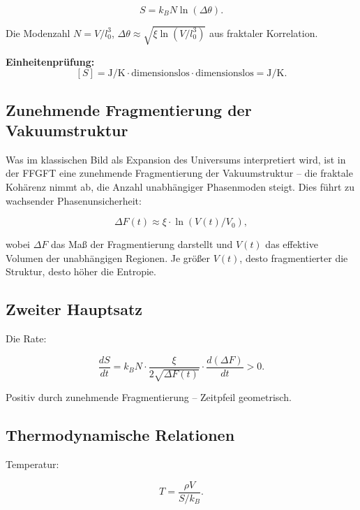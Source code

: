 	\begin{equation}
		S = k_B N \ln(\Delta \theta).
	\end{equation}
	
	Die Modenzahl \(N = V / l_0^3\), \(\Delta \theta \approx \sqrt{\xi \ln(V/l_0^3)}\) aus fraktaler Korrelation.
	
	\textbf{Einheitenprüfung:}
	\[
	[S] = \si{\joule\per\kelvin} \cdot \text{dimensionslos} \cdot \text{dimensionslos} = \si{\joule\per\kelvin}.
	\]
	
	\subsection*{Zunehmende Fragmentierung der Vakuumstruktur}
	
	Was im klassischen Bild als Expansion des Universums interpretiert wird, ist in der FFGFT eine zunehmende Fragmentierung der Vakuumstruktur – die fraktale Kohärenz nimmt ab, die Anzahl unabhängiger Phasenmoden steigt. Dies führt zu wachsender Phasenunsicherheit:
	
	\begin{equation}
		\Delta F(t) \approx \xi \cdot \ln(V(t)/V_0),
	\end{equation}
	
	wobei \(\Delta F\) das Maß der Fragmentierung darstellt und \(V(t)\) das effektive Volumen der unabhängigen Regionen. Je größer \(V(t)\), desto fragmentierter die Struktur, desto höher die Entropie.
	
	\subsection*{Zweiter Hauptsatz}
	
	Die Rate:
	
	\begin{equation}
		\frac{dS}{dt} = k_B N \cdot \frac{\xi}{2 \sqrt{\Delta F(t)}} \cdot \frac{d(\Delta F)}{dt} > 0.
	\end{equation}
	
	Positiv durch zunehmende Fragmentierung – Zeitpfeil geometrisch.
	
	\subsection*{Thermodynamische Relationen}
	
	Temperatur:
	
	\begin{equation}
		T = \frac{\rho V}{S / k_B}.
	\end{equation}
	
